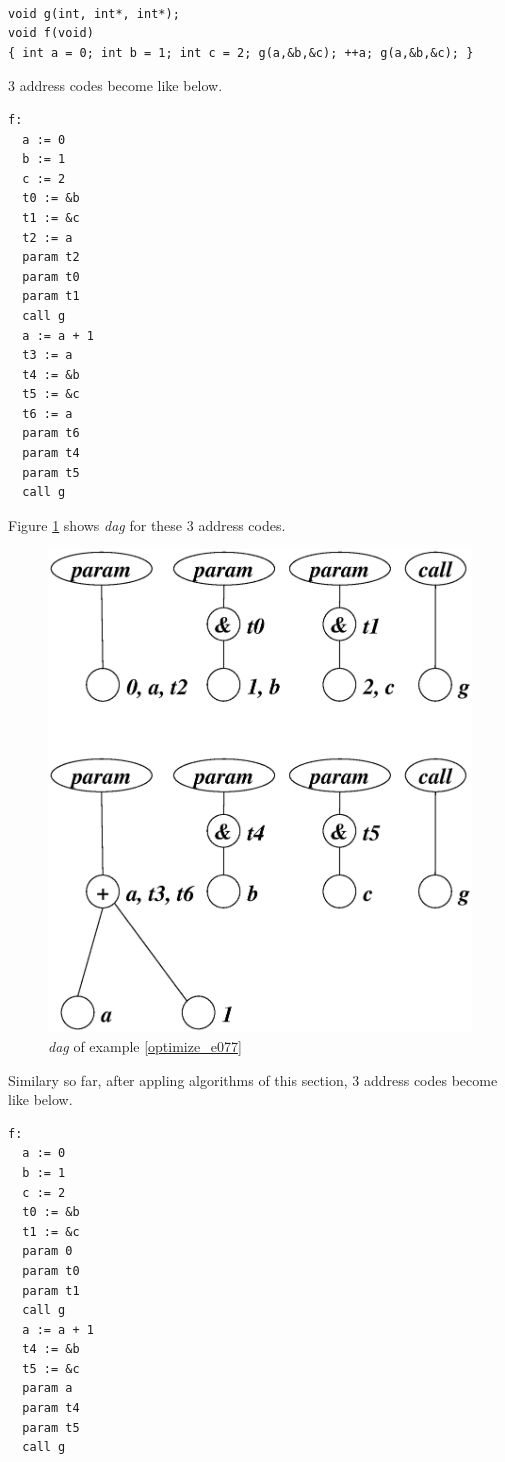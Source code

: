 \begin{Example}
\label{optimize_e077}
\begin{verbatim}

void g(int, int*, int*);
void f(void)
{ int a = 0; int b = 1; int c = 2; g(a,&b,&c); ++a; g(a,&b,&c); }
\end{verbatim}
3 address codes become like below.
\begin{verbatim}
f:
  a := 0
  b := 1
  c := 2
  t0 := &b
  t1 := &c
  t2 := a
  param t2
  param t0
  param t1
  call g
  a := a + 1
  t3 := a
  t4 := &b
  t5 := &c
  t6 := a
  param t6
  param t4
  param t5
  call g
\end{verbatim}
Figure \ref{optimize_e078} shows {\em dag} for these 3 address codes.
\begin{figure}[htbp]
\begin{center}
\includegraphics[width=1.0\linewidth,height=0.894\linewidth]{opt032.eps}
\caption{{\em dag} of example \ref{optimize_e077}}
\label{optimize_e078}
\end{center}
\end{figure}
Similary so far,
after appling algorithms of this section,
3 address codes become like below.
\begin{verbatim}
f:
  a := 0
  b := 1
  c := 2
  t0 := &b
  t1 := &c
  param 0
  param t0
  param t1
  call g
  a := a + 1
  t4 := &b
  t5 := &c
  param a
  param t4
  param t5
  call g
\end{verbatim}
\end{Example}

